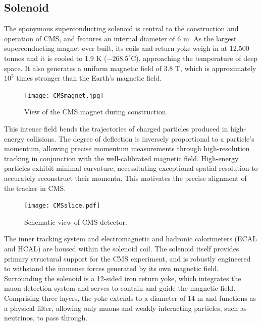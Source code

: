 \subsection{Solenoid}
The eponymous superconducting solenoid is central to the construction and operation of CMS, and features an internal diameter of 6 m. As the largest superconducting magnet ever built, its coils and return yoke weigh in at 12,500 tonnes and it is cooled to 1.9 K ($-268.5^\circ$C), approaching the temperature of deep space. It also generates a uniform magnetic field of 3.8 T, which is approximately $10^5$ times stronger than the Earth's magnetic field.

\begin{figure}[!hbt]
    \begin{center}
        \texttt{[image: CMSmagnet.jpg]}
        \caption{View of the CMS magnet during construction.}
        \label{fig:CMSmagnet}
    \end{center}
\end{figure}

This intense field bends the trajectories of charged particles produced in high-energy collisions. The degree of deflection is inversely proportional to a particle’s momentum, allowing precise momentum measurements through high-resolution tracking in conjunction with the well-calibrated magnetic field. High-energy particles exhibit minimal curvature, necessitating exceptional spatial resolution to accurately reconstruct their momenta. This motivates the precise alignment of the tracker in CMS. 

\begin{figure}[!hbt]
    \begin{center}
        \texttt{[image: CMSslice.pdf]}
        \caption{Schematic view of CMS detector.}
        \label{fig:cmscutaway2}
    \end{center}
\end{figure}

The inner tracking system and electromagnetic and hadronic calorimeters (ECAL and HCAL) are housed within the solenoid coil. The solenoid itself provides primary structural support for the CMS experiment, and is robustly engineered to withstand the immense forces generated by its own magnetic field. Surrounding the solenoid is a 12-sided iron return yoke, which integrates the muon detection system and serves to contain and guide the magnetic field. Comprising three layers, the yoke extends to a diameter of 14 m and functions as a physical filter, allowing only muons and weakly interacting particles, such as neutrinos, to pass through. 

